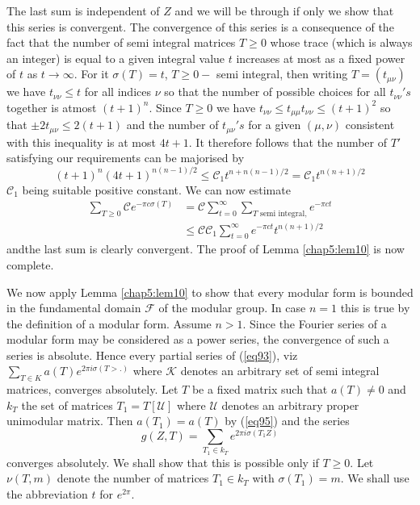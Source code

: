 The last sum is independent of $Z$ and we will be through if only we
show that this series is convergent. The convergence of this series is
a consequence of the fact that the number of semi integral matrices $T
\ge 0$ whose trace (which is always an integer) is equal to a given
integral value $t$ increases at most as a fixed power of $t$ as $t \to
\infty$. For it $\sigma (T)=t$, $T \ge 0-$ semi integral, then writing
$T=(t_{\mu \nu})$ we have $t_{\nu \nu} \le t$ for all indices $\nu$ so
that the number of possible choices for all $t_{\nu \nu}'s$
together is atmost $(t+1)^n$. Since $T \ge 0$ we have $t_{\nu \nu} \le
t_{\mu \mu}t_{\nu \nu} \le (t+1)^2$ so that $\pm 2t_{\mu \nu} \le 2 (t
  +1)$ and the number of $t_{\mu \nu}'s$ for a given $(\mu
,\nu)$ consistent with this inequality is at most $4t+1$. It
therefore follows that the number of $T'$ satisfying our
requirements can be majorised by 
$$
(t+1)^n (4t+1)^{n(n-1 )/2} \le \mathscr{C}_1 t^{n+n(n-1)/2}=
\mathscr{C}_1 t^{n(n+1 )/2} 
$$
$\mathscr{C}_1$ being suitable positive constant. We can now estimate 
\begin{align*}
\sum _{T \ge 0} \mathscr{C}e^{-\pi c \sigma (T)} &=
\mathscr{C}\sum^\infty_{t=0} \sum _{T \text{ semi integral,}} e^{-\pi
  ct}\\ 
&\le \mathscr{C}\mathscr{C}_1 \sum ^\infty _{t=0} e^{-\pi
  ct}t^{n(n+1)/2} 
\end{align*}
and\pageoriginale the last sum is clearly convergent. The proof of Lemma
\ref{chap5:lem10} is now complete. 

We now apply Lemma \ref{chap5:lem10} to show that every modular form
is boun\-ded in 
the fundamental domain $\mathcal{F}$ of the modular group. In case
$n=1$ this is true by the definition of a modular form. Assume
$n>1$. Since the Fourier series of a modular form may be considered as
a power series, the convergence of such a series is absolute. Hence
every partial series of (\ref{eq93}), viz $\sum _{T \in K} a (T)e^{2
  \pi i \sigma (T>.)}$ where $\mathscr{K}$ denotes an arbitrary set of
semi integral matrices, converges absolutely. Let $T$ be a fixed matrix
such that $a (T)\neq 0$ and $k_T$ the set of matrices
$T_1=T[\mathcal{U}]$ where $\mathcal{U}$ denotes an arbitrary proper
unimodular matrix. Then $a (T_1)= a (T)$ by (\ref{eq95}) and the
series 
\begin{equation*}
g(Z,T)= \sum _{T_1 \in k_T} e^{2 \pi i \sigma (T_1 Z)} \tag{100}\label{eq100}
\end{equation*}
converges absolutely. We shall show that this is possible only if $T
\ge 0$. Let $\nu (T, m)$ denote the number of matrices $T_1 \in k_T$
with $\sigma (T_1)=m$. We shall use the abbreviation $t$ for $e^{2
  \pi}$. 

